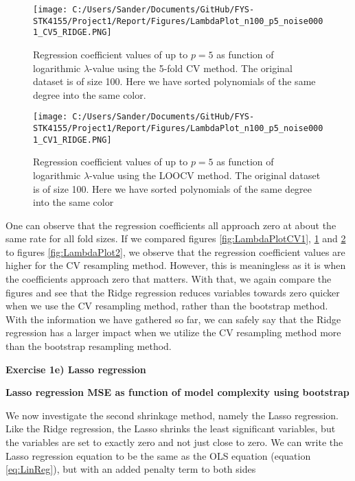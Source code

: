 \documentclass[12pt,a4paper]{article}
\begin{document}
\begin{figure}[H]
\centering
\texttt{[image: C:/Users/Sander/Documents/GitHub/FYS-STK4155/Project1/Report/Figures/LambdaPlot\_n100\_p5\_noise0001\_CV5\_RIDGE.PNG]}
\caption{\label{fig:LambdaPlotCV2} Regression coefficient values of up to $p = 5$ as function of logarithmic $\lambda$-value using the 5-fold CV method. The original dataset is of size 100. Here we have sorted polynomials of the same degree into the same color.}
\end{figure}

\begin{figure}[H]
\centering
\texttt{[image: C:/Users/Sander/Documents/GitHub/FYS-STK4155/Project1/Report/Figures/LambdaPlot\_n100\_p5\_noise0001\_CV1\_RIDGE.PNG]}
\caption{\label{fig:LambdaPlotCV3} Regression coefficient values of up to $p = 5$ as function of logarithmic $\lambda$-value using the LOOCV method. The original dataset is of size 100. Here we have sorted polynomials of the same degree into the same color}
\end{figure}

\noindent One can observe that the regression coefficients all approach zero at about the same rate for all fold sizes. If we compared figures \ref{fig:LambdaPlotCV1}, \ref{fig:LambdaPlotCV2} and \ref{fig:LambdaPlotCV3} to figures \ref{fig:LambdaPlot2}, we observe that the regression coefficient values are higher for the CV resampling method. However, this is meaningless as it is when the coefficients approach zero that matters. With that, we again compare the figures and see that the Ridge regression reduces variables towards zero quicker when we use the CV resampling method, rather than the bootstrap method.
\\
With the information we have gathered so far, we can safely say that the Ridge regression has a larger impact when we utilize the CV resampling method more than the bootstrap resampling method.

\newpage

\begin{center}
\Large{\textbf{Exercise 1e) Lasso regression}}
\end{center}

\begin{center}
\large{\textbf{Lasso regression MSE as function of model complexity using bootstrap}}
\end{center}

\noindent We now investigate the second shrinkage method, namely the Lasso regression. Like the Ridge regression, the Lasso shrinks the least significant variables, but the variables are set to exactly zero and not just close to zero. We can write the Lasso regression equation to be the same as the OLS equation (equation \ref{eq:LinReg}), but with an added penalty term to both sides 
\end{document}
